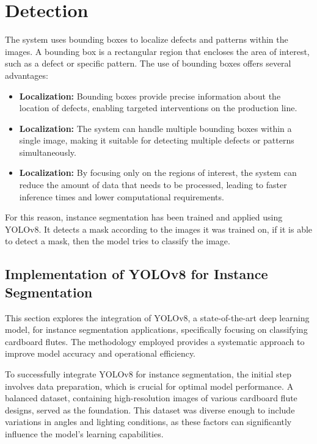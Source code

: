 \section{Detection}
The system uses bounding boxes to localize defects and patterns within the images. A bounding box is a rectangular region that encloses the area of interest, such as a defect or specific pattern. The use of bounding boxes offers several advantages:

\begin{itemize}
	\item \textbf{Localization:} Bounding boxes provide precise information about the location of defects, enabling targeted interventions on the production line.
	\item \textbf{Localization:} The system can handle multiple bounding boxes within a single image, making it suitable for detecting multiple defects or patterns simultaneously.
	\item \textbf{Localization:} By focusing only on the regions of interest, the system can reduce the amount of data that needs to be processed, leading to faster inference times and lower computational requirements.
	
\end{itemize}

For this reason, instance segmentation has been trained and applied using YOLOv8. It detects a mask according to the images it was trained on, if it is able to detect a mask, then the model tries to classify the image.


\subsection{Implementation of YOLOv8 for Instance Segmentation}

This section explores the integration of YOLOv8, a state-of-the-art deep learning model, for instance segmentation applications, specifically focusing on classifying cardboard flutes. The methodology employed provides a systematic approach to improve model accuracy and operational efficiency. 

To successfully integrate YOLOv8 for instance segmentation, the initial step involves data preparation, which is crucial for optimal model performance. A balanced dataset, containing high-resolution images of various cardboard flute designs, served as the foundation. This dataset was diverse enough to include variations in angles and lighting conditions, as these factors can significantly influence the model's learning capabilities.

